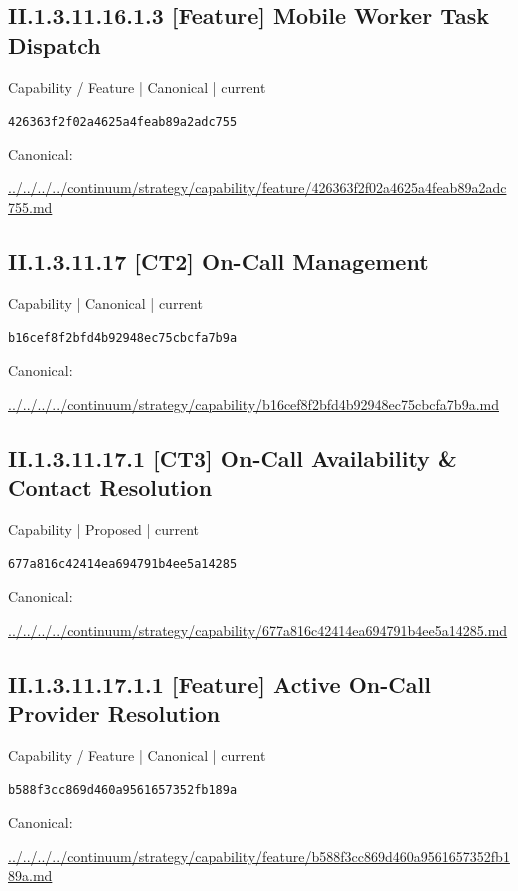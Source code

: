 \documentclass[10pt,a4paper]{article}
\begin{document}
\subsection*{II.1.3.11.16.1.3 [Feature] Mobile Worker Task Dispatch}
{\small Capability / Feature | Canonical | current}\par
\texttt{426363f2f02a4625a4feab89a2adc755}\par
Canonical: \par
{\footnotesize\url{../../../../continuum/strategy/capability/feature/426363f2f02a4625a4feab89a2adc755.md}}\par
\subsection*{II.1.3.11.17 [CT2] On-Call Management}
{\small Capability | Canonical | current}\par
\texttt{b16cef8f2bfd4b92948ec75cbcfa7b9a}\par
Canonical: \par
{\footnotesize\url{../../../../continuum/strategy/capability/b16cef8f2bfd4b92948ec75cbcfa7b9a.md}}\par
\subsection*{II.1.3.11.17.1 [CT3] On-Call Availability \& Contact Resolution}
{\small Capability | Proposed | current}\par
\texttt{677a816c42414ea694791b4ee5a14285}\par
Canonical: \par
{\footnotesize\url{../../../../continuum/strategy/capability/677a816c42414ea694791b4ee5a14285.md}}\par
\subsection*{II.1.3.11.17.1.1 [Feature] Active On-Call Provider Resolution}
{\small Capability / Feature | Canonical | current}\par
\texttt{b588f3cc869d460a9561657352fb189a}\par
Canonical: \par
{\footnotesize\url{../../../../continuum/strategy/capability/feature/b588f3cc869d460a9561657352fb189a.md}}\par
\end{document}

